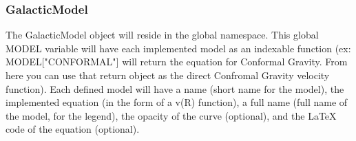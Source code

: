 \documentclass[titlepage]{article}
\begin{document}
\subsubsection{GalacticModel}
The GalacticModel object will reside in the global namespace. This global MODEL variable will have each implemented model as an indexable function (ex: MODEL["CONFORMAL"] will return the equation for Conformal Gravity. From here you can use that return object as the direct Confromal Gravity velocity function). Each defined model will have a name (short name for the model), the implemented equation (in the form of a v(R) function), a full name (full name of the model, for the legend), the opacity of the curve (optional), and the \LaTeX \- code of the equation (optional).
\end{document}
